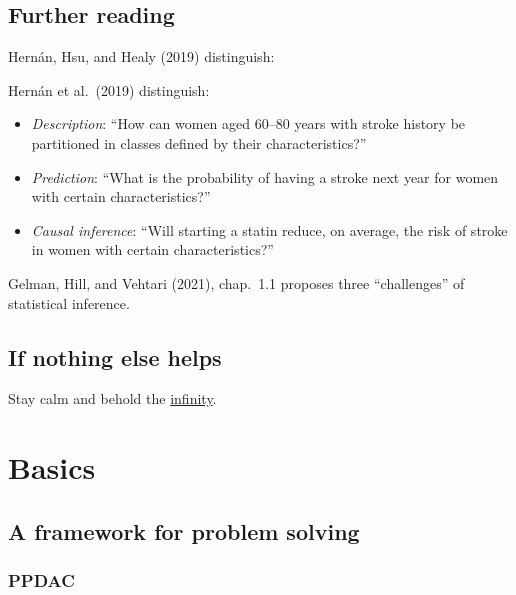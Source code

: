 \documentclass[
  letterpaper,
  DIV=11,
  numbers=noendperiod]{scrreprt}
\theoremstyle{definition}
\theoremstyle{definition}
\theoremstyle{remark}
\begin{document}
\hypertarget{further-reading}{%
\section{Further reading}\label{further-reading}}

Hernán, Hsu, and Healy (2019) distinguish:

Hernán et al.~(2019) distinguish:

\begin{itemize}
\item
  \emph{Description}: ``How can women aged 60--80 years with stroke
  history be partitioned in classes defined by their characteristics?''
\item
  \emph{Prediction}: ``What is the probability of having a stroke next
  year for women with certain characteristics?''
\item
  \emph{Causal inference}: ``Will starting a statin reduce, on average,
  the risk of stroke in women with certain characteristics?''
\end{itemize}

Gelman, Hill, and Vehtari (2021), chap.~1.1 proposes three
``challenges'' of statistical inference.

\hypertarget{if-nothing-else-helps}{%
\section{If nothing else helps}\label{if-nothing-else-helps}}

Stay calm and behold the
\href{https://upload.wikimedia.org/wikipedia/commons/thumb/6/69/Spiral_of_black_and_white_squares_10_till_repetition_spiraling_in.gif/600px-Spiral_of_black_and_white_squares_10_till_repetition_spiraling_in.gif?20170912223608}{infinity}.


\hypertarget{basics}{%
\chapter{Basics}\label{basics}}

\hypertarget{a-framework-for-problem-solving}{%
\section{A framework for problem
solving}\label{a-framework-for-problem-solving}}

\hypertarget{ppdac}{%
\subsection{PPDAC}\label{ppdac}}
\end{document}

